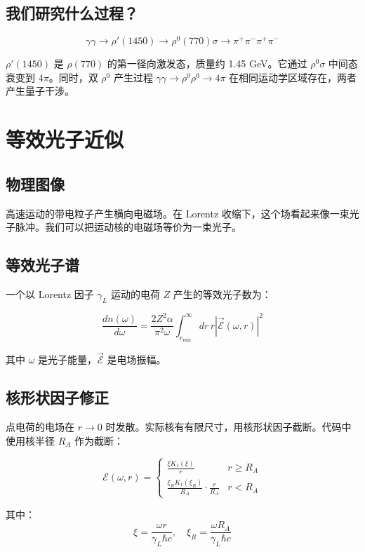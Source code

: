 \documentclass[11pt,a4paper,UTF8]{ctexart}
\begin{document}
\subsection{我们研究什么过程？}

\[
\gamma \gamma \to \rho'(1450) \to \rho^0(770) \sigma \to \pi^+\pi^-\pi^+\pi^-
\]

$\rho'(1450)$ 是 $\rho(770)$ 的第一径向激发态，质量约 1.45 GeV。它通过 $\rho^0 \sigma$ 中间态衰变到 $4\pi$。同时，双 $\rho^0$ 产生过程 $\gamma\gamma \to \rho^0\rho^0 \to 4\pi$ 在相同运动学区域存在，两者产生量子干涉。

\section{等效光子近似}

\subsection{物理图像}

高速运动的带电粒子产生横向电磁场。在 Lorentz 收缩下，这个场看起来像一束光子脉冲。我们可以把运动核的电磁场等价为一束光子。

\subsection{等效光子谱}

一个以 Lorentz 因子 $\gamma_L$ 运动的电荷 $Z$ 产生的等效光子数为：

\[
\frac{dn(\omega)}{d\omega} = \frac{2Z^2\alpha}{\pi^2\omega} \int_{r_{\text{min}}}^{\infty} dr \, r \left| \vec{\mathcal{E}}(\omega, r) \right|^2
\]

其中 $\omega$ 是光子能量，$\vec{\mathcal{E}}$ 是电场振幅。

\subsection{核形状因子修正}

点电荷的电场在 $r \to 0$ 时发散。实际核有有限尺寸，用核形状因子截断。代码中使用核半径 $R_A$ 作为截断：

\[
\mathcal{E}(\omega, r) = \begin{cases}
\displaystyle \frac{\xi K_1(\xi)}{r} & r \ge R_A \\
\displaystyle \frac{\xi_R K_1(\xi_R)}{R_A} \cdot \frac{r}{R_A} & r < R_A
\end{cases}
\]

其中：
\[
\xi = \frac{\omega r}{\gamma_L \hbar c}, \quad \xi_R = \frac{\omega R_A}{\gamma_L \hbar c}
\]
\end{document}
